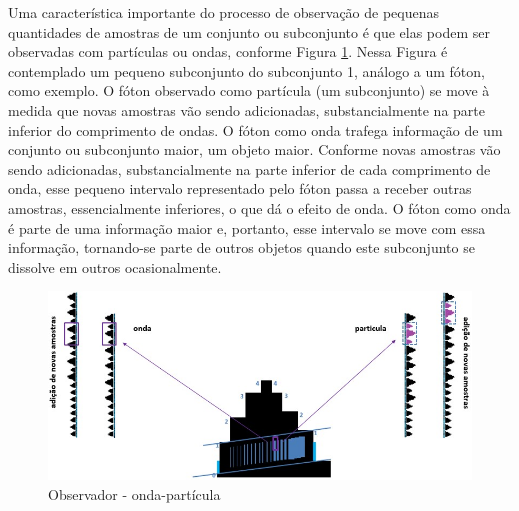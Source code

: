 Uma característica importante do processo de observação de pequenas quantidades de amostras de um conjunto ou subconjunto é que elas podem ser observadas com partículas ou ondas, conforme Figura \ref{fig:consciousness_space_wave-particle}. Nessa Figura é contemplado um pequeno subconjunto do subconjunto 1, análogo a um fóton, como exemplo. O fóton observado como partícula (um subconjunto) se move à medida que novas amostras vão sendo adicionadas, substancialmente na parte inferior do comprimento de ondas. O fóton como onda trafega informação de um conjunto ou subconjunto maior, um objeto maior. Conforme novas amostras vão sendo adicionadas, substancialmente na parte inferior de cada comprimento de onda, esse pequeno intervalo representado pelo fóton passa a receber outras amostras, essencialmente inferiores, o que dá o efeito de onda. O fóton como onda é parte de uma informação maior e, portanto, esse intervalo se move com essa informação, tornando-se parte de outros objetos quando este subconjunto se dissolve em outros ocasionalmente.
	\begin{figure}[H]
	\caption{Observador - onda-partícula}
	\label{fig:consciousness_space_wave-particle}
	\centering
	\includegraphics[scale=.65]{sections/images/consciousness_space_wave-particle.jpg}
	\end{figure}
	
